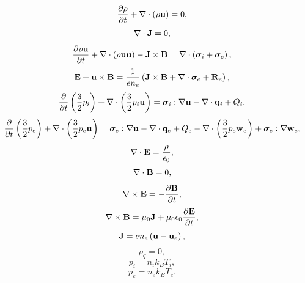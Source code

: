 \documentclass[a4paper,11pt]{report}
\begin{document}
\begin{equation}
    \label{eq:sf_1ion_ni}
    \frac{\partial \rho}{\partial t} + \nabla \cdot \left( \rho \mathbf{u} \right) = 0,
\end{equation}
\begin{equation}
    \label{eq:sf_1ion_ne}
    \nabla \cdot \mathbf{J} = 0,
\end{equation}
\begin{equation}
    \label{eq:sf_1ion_ui}
    \frac{\partial \rho \mathbf{u}}{\partial t} + \nabla \cdot \left( \rho \mathbf{u} \mathbf{u} \right) - \mathbf{J} \times \mathbf{B} = \nabla \cdot \left( \bm \sigma_i + \bm \sigma_e \right),
\end{equation}
\begin{equation}
    \label{eq:sf_1ion_ue}
    \mathbf{E} + \mathbf{u} \times \mathbf{B} = \frac{1}{e n_e} \left( \mathbf{J} \times \mathbf{B} + \nabla \cdot \bm \sigma_e + \mathbf{R}_e \right),
\end{equation}
\begin{equation}
    \label{eq:sf_1ion_iei}
    \frac{\partial}{\partial t} \left( \frac{3}{2} p_i \right) + \nabla \cdot \left( \frac{3}{2} p_i \mathbf{u} \right) = \bm \sigma_i : \nabla \mathbf{u} - \nabla \cdot \mathbf{q}_i + Q_i,
\end{equation}
\begin{equation}
    \label{eq:sf_1ion_iee}
    \frac{\partial}{\partial t} \left( \frac{3}{2} p_e \right) + \nabla \cdot \left( \frac{3}{2} p_e \mathbf{u} \right) = \bm \sigma_e : \nabla \mathbf{u} - \nabla \cdot \mathbf{q}_e + Q_e - \nabla \cdot \left( \frac{3}{2} p_e \mathbf{w}_e \right) + \bm \sigma_e : \nabla \mathbf{w}_e,
\end{equation}
\begin{equation}
    \label{eq:sf_1ion_maxwell_3}
    \nabla \cdot \mathbf{E} = \frac{\rho}{\epsilon_0},
\end{equation}
\begin{equation}
    \label{eq:sf_1ion_maxwell_4}
    \nabla \cdot \mathbf{B} = 0,
\end{equation}
\begin{equation}
    \label{eq:sf_1ion_maxwell_1}
    \nabla \times \mathbf{E} = -\frac{ \partial \mathbf{B}}{\partial t},
\end{equation}
\begin{equation}
    \label{eq:sf_1ion_maxwell_2}
    \nabla \times \mathbf{B} = \mu_0 \mathbf{J} + \mu_0 \epsilon_0 \frac{\partial \mathbf{E}}{\partial t},
\end{equation}
\begin{equation}
    \label{eq:sf_1ion_curr_density}
    \mathbf{J} = e n_e \left( \mathbf{u} - \mathbf{u}_e \right),
\end{equation}
\begin{equation}
    \label{eq:sf_1ion_mass_density}
    \rho_q = 0,
\end{equation}
\begin{equation}
    \label{eq:sf_1ion_eos_ion}
    p_i = n_i k_B T_i,
\end{equation}
\begin{equation}
    \label{eq:sf_1ion_eos_elec}
    p_e = n_e k_B T_e.
\end{equation}
\end{document}
